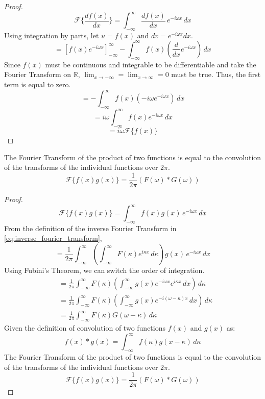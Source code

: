 \begin{proof}
    \[ \mathcal{F}\{ \frac{d f(x)}{dx} \} = \int_{-\infty}^{\infty} \frac{d f(x)}{dx}  \, e^{-i \omega x} \,dx \]
    Using integration by parts, let \(u = f(x)\) and \(dv = e^{-i \omega x} dx\).
    \[ = \left[ f(x) e^{-i \omega x} \right]_{-\infty}^{\infty} - \int_{-\infty}^{\infty} f(x) \left( \frac{d}{dx} e^{-i \omega x} \right) \,dx \]
    Since \(f(x)\) must be continuous and integrable to be differentiable and take the Fourier Transform on \(\mathbb{R}\), \(\lim_{x \to -\infty}=\lim_{x \to \infty}=0\) must be true. Thus, the first term is equal to zero. 
    \[ = - \int_{-\infty}^{\infty} f(x) \left( -i \omega e^{-i \omega x} \right) \,dx \]
    \[ = i \omega \int_{-\infty}^{\infty} f(x) e^{-i \omega x} \,dx \]
    \[ = i \omega \mathcal{F}\{ f(x) \} \]
\end{proof}

\begin{theorem}
    \label{fourier_multiplication}
    The Fourier Transform of the product of two functions is equal to the convolution of the transforms of the individual functions over \(2 \pi\).
    \begin{equation}
        \mathcal{F}\{ f(x) g(x) \} = \frac{1}{2 \pi}( F(\omega) * G(\omega) )
    \end{equation}
\end{theorem}

\begin{proof}
    \[ \mathcal{F}\{ f(x) g(x) \} = \int_{-\infty}^{\infty} f(x) g(x) \, e^{-i \omega x} \,dx \]
    From the definition of the inverse Fourier Transform in \cref{eq:inverse_fourier_transform},
    \[ = \frac{1}{2 \pi} \int_{-\infty}^{\infty} \left( \int_{-\infty}^{\infty} F(\kappa) e^{i \kappa x} \,d\kappa \right) g(x) \, e^{-i \omega x} \,dx \]
    Using Fubini's Theorem, we can switch the order of integration.
    \begin{align*}
        &= \frac{1}{2 \pi} \int_{-\infty}^{\infty} F(\kappa) \left( \int_{-\infty}^{\infty} g(x) e^{-i \omega x} e^{i \kappa x} \,dx \right) \,d\kappa \\
        &= \frac{1}{2 \pi} \int_{-\infty}^{\infty} F(\kappa) \left( \int_{-\infty}^{\infty} g(x) e^{-i (\omega - \kappa) x} \,dx \right) \,d\kappa \\
        &= \frac{1}{2 \pi} \int_{-\infty}^{\infty} F(\kappa) G(\omega - \kappa) \,d\kappa
    \end{align*}
    Given the definition of convolution of two functions \(f(x)\) and \(g(x)\) as:
    \[ f(x) * g(x) = \int_{-\infty}^{\infty} f(\kappa) g(x-\kappa) \,d\kappa \]
    The Fourier Transform of the product of two functions is equal to the convolution of the transforms of the individual functions over \(2 \pi\).
    \[ \mathcal{F}\{ f(x) g(x) \} = \frac{1}{2 \pi}( F(\omega) * G(\omega) ) \]
\end{proof}